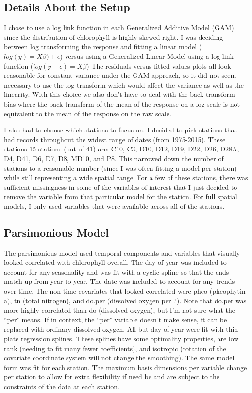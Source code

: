 \documentclass[12pt]{amsart}
\begin{document}
\subsection{Details About the Setup}
I chose to use a log link function in each Generalized Additive Model (GAM) since the distribution of chlorophyll is highly skewed right. I was deciding between log transforming the response and fitting a linear model ($log(y)=X\beta)+\epsilon$) versus using a Generalized Linear Model using a log link function ($log(y+\epsilon)= X\beta$) The residuals versus fitted values plots all look reasonable for constant variance under the GAM approach, so it did not seem necessary to use the log transform which would affect the variance as well as the linearity. With this choice we also don't have to deal with the back-transform bias where the back transform of the mean of the response on a log scale is not equivalent to the mean of the response on the raw scale.

I also had to choose which stations to focus on. I decided to pick stations that had records throughout the widest range of dates (from 1975-2015). These stations 15 stations (out of 41) are: C10, C3, D10, D12, D19, D22, D26, D28A, D4, D41, D6, D7, D8, MD10, and P8. This narrowed down the number of stations to a reasonable number (since I was often fitting a model per station) while still representing a wide spatial range. For a few of these stations, there was sufficient missingness in some of the variables of interest that I just decided to remove the variable from that particular model for the station. For full spatial models, I only used variables that were available across all of the stations.


\subsection{Parsimonious Model}

The parsimonious model used temporal components and variables that visually looked correlated with chlorophyll overall. The day of year was included to account for any seasonality and was fit with a cyclic spline so that the ends match up from year to year. The date was included to account for any trends over time. The non-time covariates that looked correlated were pheo (pheophytin a), tn (total nitrogen), and do.per (dissolved oxygen per ?). Note that do.per was more highly correlated than do (dissolved oxygen), but I'm not sure what the ``per" means. If in context, the ``per" variable doesn't make sense, it can be replaced with ordinary dissolved oxygen. All but day of year were fit with thin plate regression splines. These splines have some optimality properties, are low rank (needing to fit many fewer coefficients), and isotropic (rotation of the covariate coordinate system will not change the smoothing). The same model form was fit for each station. The maximum basis dimensions per variable change per station to allow for extra flexibility if need be and are subject to the constraints of the data at each station.  
\end{document}
